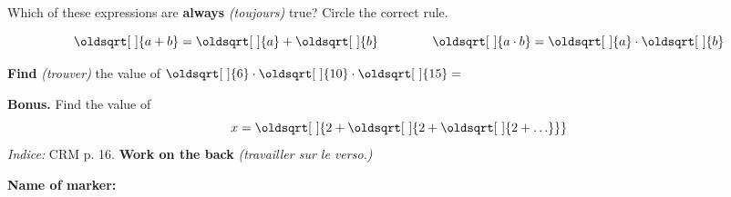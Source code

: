 \documentclass[12pt]{exam}
\renewcommand*{\sqrt}[2][\ ]{\oldsqrt[#1]{#2}}
\begin{document}
\begin{questions}
\question[1] Which of these expressions are \textbf{always} \emph{(toujours)} true? Circle the correct rule.

$$ \sqrt{a + b} = \sqrt{a} + \sqrt{b} \hspace{15mm} \sqrt{a \cdot b} = \sqrt{a} \cdot \sqrt{b}$$

\question[1] \textbf{Find} \emph{(trouver)} the value of $\sqrt{6} \cdot \sqrt{10} \cdot \sqrt{15}= $  \dotfill
\fillwithdottedlines{13mm}

\vfill

\question \textbf{Bonus.} Find the value of $$ x = \sqrt{2+\sqrt {2+\sqrt { 2+\ldots}}}$$
\emph{Indice:} CRM p. 16. 
\hfill \textbf{Work on the back} \emph{(travailler sur le verso.)}


\end{questions}

\begin{tcolorbox}

\textbf{Name of marker:}

\begin{center}
\gradetable[h][questions]
\end{center}

\end{tcolorbox}
\end{document}
